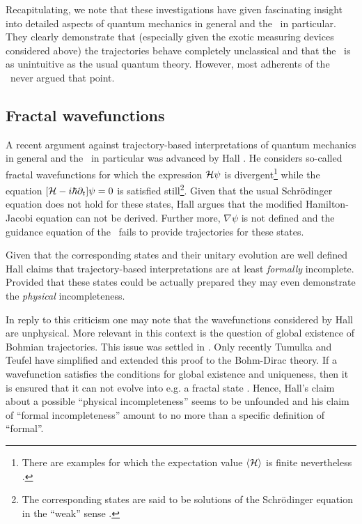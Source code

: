 Recapitulating, we note that these investigations have given fascinating insight into detailed aspects of quantum mechanics in general 
and the \dbb\ in particular. They clearly demonstrate that (especially given the exotic measuring devices considered above) the 
trajectories behave completely unclassical and that the \dbb\ is as unintuitive as the usual quantum theory. However, most adherents 
of the \dbb\ never argued that point.

\subsection{Fractal wavefunctions}
A recent argument against trajectory-based interpretations of quantum mechanics in general and the \dbb\ in particular was 
advanced by Hall \cite{hall}. He considers so-called fractal  wavefunctions for which the expression ${\cal{H}}\psi$ is 
divergent\footnote{There are examples for which the expectation value $\langle {\cal{H}} \rangle$ is finite nevertheless 
\cite{hall}.} while the equation  $[ {\cal{H}}-i\hbar\partial_t]\psi=0$ is satisfied still\footnote{The corresponding states are said 
to be solutions of the Schr\"odinger equation in the ``weak'' sense \cite{weak}.}. 
Given that the usual  Schr\"odinger equation  does not hold for these states, Hall argues that the modified Hamilton-Jacobi equation 
can not be derived. Further more, $\nabla \psi$ is not defined and the guidance equation of the \dbb\ fails to provide trajectories for 
these states. 

Given that the corresponding states and their unitary evolution are well defined Hall claims that trajectory-based interpretations 
are at least {\em formally} incomplete. Provided that these states could be actually prepared they may even demonstrate the 
{\em physical} incompleteness.  

In reply to this criticism one may note that the wavefunctions considered by Hall are unphysical. More relevant in this context is the  
question of global existence of Bohmian trajectories. This issue was settled in \cite{eunde}. Only recently Tumulka and Teufel  
\cite{simple} have simplified and extended this proof to the Bohm-Dirac theory. If a wavefunction satisfies the 
conditions for global existence and uniqueness, then it is ensured that it can not evolve into e.g. a fractal state \cite{pc}. 
Hence, Hall's claim about a possible ``physical incompleteness'' seems to be unfounded and his claim of  ``formal incompleteness'' 
amount to no more  than a specific definition of ``formal''. 

